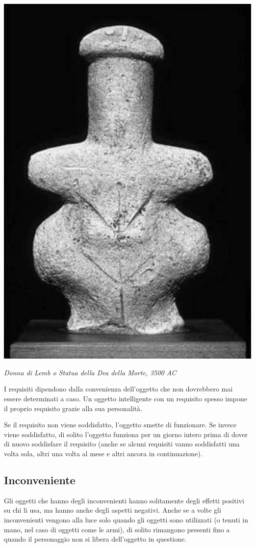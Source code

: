 \begin{multicols}{2}
\begin{center}
\includegraphics[width=0.8\linewidth]{immagini/donnalemb.png}

\textit{Donna di Lemb o Statua della Dea della Morte, 3500 AC}
\end{center}

\medskip

I requisiti dipendono dalla convenienza dell'oggetto che non dovrebbero mai essere determinati a caso. Un oggetto intelligente con un requisito spesso impone il proprio requisito grazie alla sua personalità.

Se il requisito non viene soddisfatto, l'oggetto smette di funzionare. Se invece viene soddisfatto, di solito l'oggetto funziona per un giorno intero prima di dover di nuovo soddisfare il requisito (anche se alcuni requisiti vanno soddisfatti una volta sola, altri una volta al mese e altri ancora in continuazione).

\subsection{Inconveniente}

Gli oggetti che hanno degli inconvenienti hanno solitamente degli effetti positivi su chi li usa, ma hanno anche degli aspetti negativi. Anche se a volte gli inconvenienti vengono alla luce solo quando gli oggetti sono utilizzati (o tenuti in mano, nel caso di oggetti come le armi), di solito rimangono presenti fino a quando il personaggio non si libera dell'oggetto in questione.


\end{multicols}
